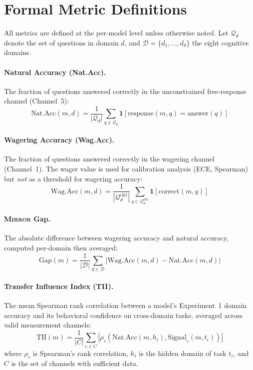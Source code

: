 \documentclass[10pt]{article}
\newcommand{\mirror}{\textsc{Mirror}}
\newcommand{\TII}{TII}
\begin{document}
\section{Formal Metric Definitions}
\label{app:metrics}

All metrics are defined at the per-model level unless otherwise noted. Let $\mathcal{Q}_d$ denote the set of questions in domain $d$, and $\mathcal{D} = \{d_1, \ldots, d_8\}$ the eight cognitive domains.

\paragraph{Natural Accuracy (Nat.Acc).}
The fraction of questions answered correctly in the unconstrained free-response channel (Channel~5):
\begin{equation}
\text{Nat.Acc}(m, d) = \frac{1}{|\mathcal{Q}_d|} \sum_{q \in \mathcal{Q}_d} \mathbf{1}[\text{response}(m, q) = \text{answer}(q)]
\end{equation}

\paragraph{Wagering Accuracy (Wag.Acc).}
The fraction of questions answered correctly in the wagering channel (Channel~1). The wager value is used for calibration analysis (ECE, Spearman) but \textit{not} as a threshold for wagering accuracy:
\begin{equation}
\text{Wag.Acc}(m, d) = \frac{1}{|\mathcal{Q}_d^{\text{ch1}}|} \sum_{q \in \mathcal{Q}_d^{\text{ch1}}} \mathbf{1}[\text{correct}(m, q)]
\end{equation}

\paragraph{\mirror{} Gap.}
The absolute difference between wagering accuracy and natural accuracy, computed per-domain then averaged:
\begin{equation}
\text{Gap}(m) = \frac{1}{|\mathcal{D}|} \sum_{d \in \mathcal{D}} |\text{Wag.Acc}(m, d) - \text{Nat.Acc}(m, d)|
\end{equation}

\paragraph{Transfer Influence Index (\TII{}).}
The mean Spearman rank correlation between a model's Experiment~1 domain accuracy and its behavioral confidence on cross-domain tasks, averaged across valid measurement channels:
\begin{equation}
\text{TII}(m) = \frac{1}{|C|} \sum_{c \in C} |\rho_s(\text{Nat.Acc}(m, h_i), \text{Signal}_c(m, t_i))|
\end{equation}
where $\rho_s$ is Spearman's rank correlation, $h_i$ is the hidden domain of task $t_i$, and $C$ is the set of channels with sufficient data.
\end{document}
